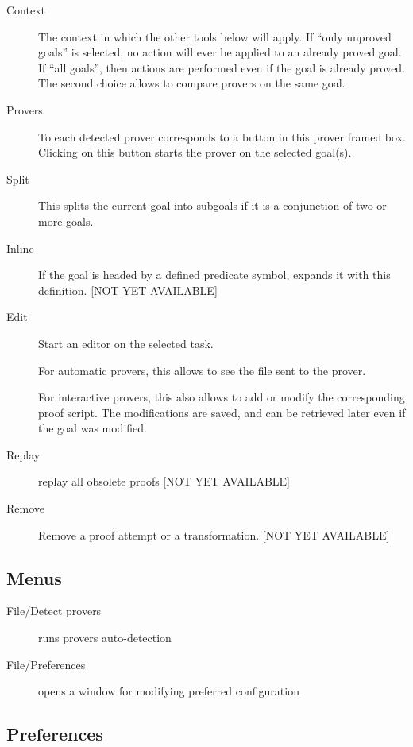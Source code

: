 \begin{description}
\item[Context] The context in which the other tools below will
  apply. If ``only unproved goals'' is selected, no action will ever
  be applied to an already proved goal.  If ``all goals'', then
  actions are performed even if the goal is already proved. The second
  choice allows to compare provers on the same goal.

\item[Provers] To each detected prover corresponds to a button in this
  prover framed box. Clicking on this button starts the prover on the
  selected goal(s).

\item[Split] This splits the current goal into subgoals if it is a
  conjunction of two or more goals.

\item[Inline] If the goal is headed by a defined predicate symbol,
  expands it with this definition. [NOT YET AVAILABLE]

\item[Edit] Start an editor on the selected task.

  For automatic provers, this allows to see the file sent to the
  prover.

  For interactive provers, this also allows to add or modify the
  corresponding proof script. The modifications are saved, and can be
  retrieved later even if the goal was modified.

\item[Replay] replay all obsolete proofs [NOT YET AVAILABLE]

\item[Remove] Remove a proof attempt or a transformation. [NOT YET AVAILABLE]

\end{description}

\subsection{Menus}

\begin{description}
\item[File/Detect provers] runs provers auto-detection
\item[File/Preferences] opens a window for modifying preferred configuration
\end{description}

\subsection{Preferences}

